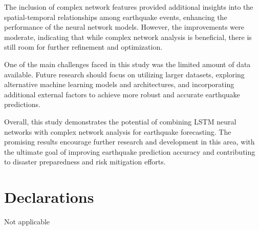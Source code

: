 \documentclass[sn-mathphys-num]{sn-jnl}
\begin{document}
The inclusion of complex network features provided additional insights into the spatial-temporal relationships among earthquake events, enhancing the performance of the neural network models. However, the improvements were moderate, indicating that while complex network analysis is beneficial, there is still room for further refinement and optimization.

One of the main challenges faced in this study was the limited amount of data available. Future research should focus on utilizing larger datasets, exploring alternative machine learning models and architectures, and incorporating additional external factors to achieve more robust and accurate earthquake predictions.

Overall, this study demonstrates the potential of combining LSTM neural networks with complex network analysis for earthquake forecasting. The promising results encourage further research and development in this area, with the ultimate goal of improving earthquake prediction accuracy and contributing to disaster preparedness and risk mitigation efforts.

\backmatter








\section*{Declarations}
Not applicable
\end{document}
